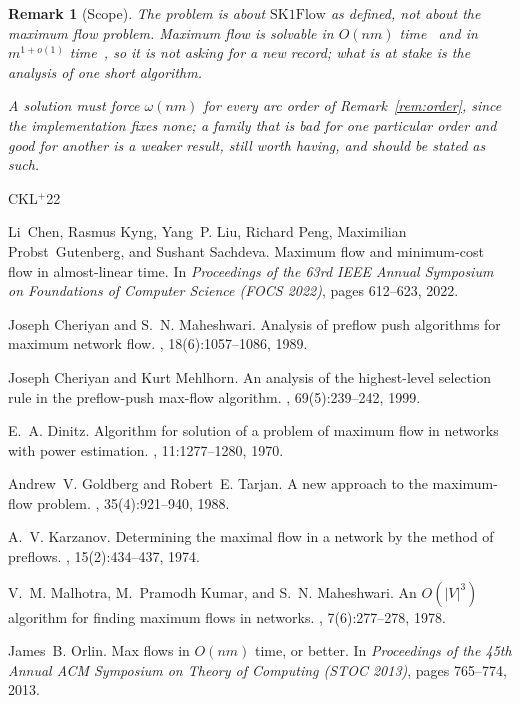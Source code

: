 \documentclass[10pt]{article}
\newtheorem{remark}[theorem]{Remark}
\newcommand{\SKF}{\text{SK1Flow}}
\begin{document}
\begin{remark}[Scope]\label{rem:scope}
The problem is about $\SKF$ as defined, not about the maximum flow problem.
Maximum flow is solvable in $O(nm)$ time~\cite{Orlin13} and in
$m^{1+o(1)}$ time~\cite{CKLPGS22}, so it is not asking for a new record; what is
at stake is the analysis of one short algorithm.

A solution must force $\omega(nm)$ for every arc order of
Remark~\ref{rem:order}, since the implementation fixes none; a family that is bad
for one particular order and good for another is a weaker result, still worth
having, and should be stated as such.
\end{remark}

\newcommand{\etalchar}[1]{$^{#1}$}
\begin{thebibliography}{CKL{\etalchar{+}}22}

\bibitem[CKL{\etalchar{+}}22]{CKLPGS22}
Li~Chen, Rasmus Kyng, Yang~P. Liu, Richard Peng, Maximilian Probst~Gutenberg,
  and Sushant Sachdeva.
\newblock Maximum flow and minimum-cost flow in almost-linear time.
\newblock In {\em Proceedings of the 63rd IEEE Annual Symposium on Foundations
  of Computer Science (FOCS 2022)}, pages 612--623, 2022.

Joseph Cheriyan and S.~N. Maheshwari.
\newblock Analysis of preflow push algorithms for maximum network flow.
, 18(6):1057--1086, 1989.

Joseph Cheriyan and Kurt Mehlhorn.
\newblock An analysis of the highest-level selection rule in the preflow-push
  max-flow algorithm.
, 69(5):239--242, 1999.

E.~A. Dinitz.
\newblock Algorithm for solution of a problem of maximum flow in networks with
  power estimation.
, 11:1277--1280, 1970.

Andrew~V. Goldberg and Robert~E. Tarjan.
\newblock A new approach to the maximum-flow problem.
, 35(4):921--940, 1988.

A.~V. Karzanov.
\newblock Determining the maximal flow in a network by the method of preflows.
, 15(2):434--437, 1974.

V.~M. Malhotra, M.~Pramodh Kumar, and S.~N. Maheshwari.
\newblock An {$O(|V|^3)$} algorithm for finding maximum flows in networks.
, 7(6):277--278, 1978.

James~B. Orlin.
\newblock Max flows in {$O(nm)$} time, or better.
\newblock In {\em Proceedings of the 45th Annual ACM Symposium on Theory of
  Computing (STOC 2013)}, pages 765--774, 2013.

\end{thebibliography}
\end{document}
